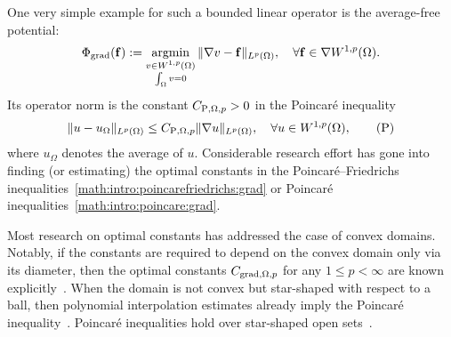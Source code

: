\documentclass[10pt,letterpaper]{article}
\begin{document}
One very simple example for such a bounded linear operator is the average-free potential: %
\begin{align*}
    \Phi_{\operatorname{grad}}( {\mathbf f} ) 
    := 
    \operatorname*{{\rm argmin}}\limits_{ \substack{ v \in W^{1,p}(\Omega) \\ \int_\Omega v = 0 } } \| \nabla v - {\mathbf f} \|_{L^{p}(\Omega)},
    \quad 
    \forall 
    {\mathbf f} \in \nabla W^{1,p}(\Omega)
    .
\end{align*} 
Its operator norm is the constant $C_{{\rm P},\Omega,p} > 0$ in the Poincar\'e inequality 
\begin{align}\label{math:intro:poincare:grad}
    \| u - u_{\Omega} \|_{L^{p}(\Omega)}
    \leq 
    C_{{\rm P},\Omega,p} \| \nabla u \|_{L^{p}(\Omega)},
    \quad 
    \forall 
    u \in W^{1,p}(\Omega)
    , \tag{P} %
\end{align}
where $u_\Omega$ denotes the average of $u$.
Considerable research effort has gone into finding (or estimating) the optimal constants in the Poincar\'e--Friedrichs inequalities~\eqref{math:intro:poincarefriedrichs:grad} or Poincar\'e inequalities~\eqref{math:intro:poincare:grad}. 

Most research on optimal constants has addressed the case of convex domains. 
Notably, if the constants are required to depend on the convex domain only via its diameter, 
then the optimal constants $C_{\operatorname{grad},\Omega,p}$ for any $1 \leq p < \infty$ are known explicitly~\cite{bebendorf2003note,acosta2004optimal,esposito2013poincare,ferone2012remark}.
When the domain is not convex but star-shaped with respect to a ball,
then polynomial interpolation estimates already imply the Poincar\'e inequality~\cite{brenner2008mathematical,ern2021finite}. 
Poincar\'e inequalities hold over star-shaped open sets~\cite[Theorem~3.1]{hurri1988poincare}. %
\end{document}
